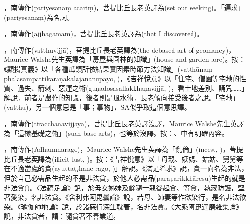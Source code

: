 \startitemgroup[noteitems]
\item{}，南傳作(pariyesanaṃ acariṃ)，菩提比丘長老英譯為(set out seeking)。「遍求」(pariyesanaṃ)為名詞。
\item{}，南傳作(ajjhagamaṃ)，菩提比丘長老英譯為(that I discovered)。
\stopitemgroup

\startitemgroup[noteitems]
\item{}，南傳作(vatthuvijjā)，菩提比丘長老英譯為(the debased art of geomancy)，Maurice Walshe先生英譯為「房屋與園林的知識」(house-and garden-lore)。按：《顯揚真義》以「各種瓜類所依結果實因素時節方法知識」(vatthūnaṃ phalasampattikāraṇakālajānanupāyo, )，《吉祥悅意》以「住宅、僧園等宅地的性質、過失、箭刺、惡運之術(guṇadosasallakkhaṇavijjā, )，看土地差別、誦咒……」解說，前者是農作的知識，後者則是風水術，長老傾向接受後者之說。「宅地」(vatthu)，另一個意思是「事；事物」，SA似乎取這個意思譯。
\item{}，南傳作(tiracchānavijjāya)，菩提比丘長老英譯沒譯，Maurice Walshe先生英譯為「這樣基礎之術」(such base arts)，也等於沒譯。按：、中有明確內容。
\stopitemgroup

\startitemgroup[noteitems]
\item{}，南傳作(Adhammarāgo)，Maurice Walshe先生英譯為「亂倫」(incest, )，菩提比丘長老英譯為(illicit lust, )。按：《吉祥悅意》以「母親、姨媽、姑姑、舅舅等在不適當處的貪(ayuttaṭṭhāne rāgo, )」解說。《滿足希求》說，貪一向名為非法，但於自己必需品生起的不是非法貪，於他人必需品(paraparikkhāresu)生起的就是非法貪()。《法蘊足論》說，於母女姊妹及餘隨一親眷起貪、等貪，執藏防護，堅著愛染，名非法貪。《舍利弗阿毘曇論》說，若母、師妻等作欲染行，是名非法欲染。《瑜伽師地論》說，於諸惡行深生耽著，名非法貪。《大乘阿毘達磨雜集論》說，非法貪者，謂：隨貪著不善業道。
\stopitemgroup

